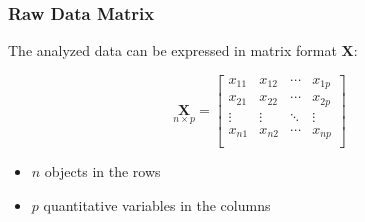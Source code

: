 \documentclass[12pt]{beamer}\usepackage[]{graphicx}\usepackage[]{color}
\begin{document}

\begin{frame}
\frametitle{}
\begin{center}
\end{center}
\end{frame}


\begin{frame}
\begin{center}
\Huge{}
\end{center}
\end{frame}


\begin{frame}
\frametitle{Raw Data Matrix}

The analyzed data can be expressed in matrix format $\mathbf{X}$:

\[ \underset{n \times p}{\mathbf{X}} = 
\left[\begin{array}{cccc}
x_{11} & x_{12} & \cdots & x_{1p} \\
x_{21} & x_{22} & \cdots & x_{2p} \\
\vdots & \vdots & \ddots & \vdots \\
x_{n1} & x_{n2} & \cdots & x_{np} \\
\end{array}\right]
\]

\begin{itemize}
 \item $n$ objects in the rows
 \item $p$ quantitative variables in the columns
\end{itemize}

\end{frame}

\end{document}
